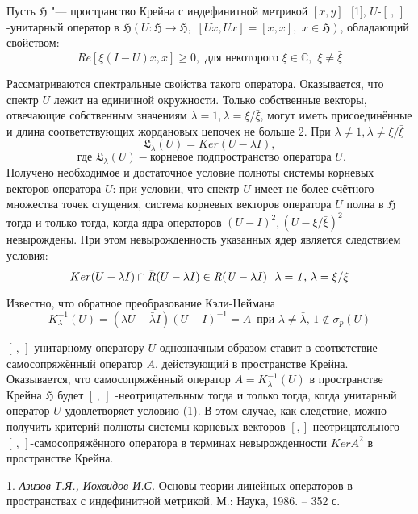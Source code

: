 

\vzmscaption
\sloppy
 Пусть $\mathfrak{H}$ "--- пространство Крейна с индефинитной метрикой $[x, y]$ \,\,[1], $U$-$[ \,, \,]$-унитарный оператор в $\mathfrak{H}( U:\mathfrak{H}\rightarrow\mathfrak{H},\,\,[Ux, Ux] = [x, x],\,\,x\in \mathfrak{H})$, обладающий свойством:
 \begin{equation}
Re[\xi(I - U)x, x]\geq 0,\,\,\text{для некоторого}\,\, \xi\in \mathbb{C},\,\,\xi\neq\bar{\xi}
\end{equation}

				Рассматриваются спектральные свойства такого оператора. Оказывается, что спектр $U$ лежит на единичной окружности. Только собственные векторы, отвечающие собственным значениям $\lambda = 1$,\,$\lambda=\xi/\bar{\xi}$, могут иметь присоединённые и длина соответствующих жордановых цепочек не больше 2. При $\lambda\neq 1, \lambda\neq\xi/\bar{\xi}$
 $$
\mathfrak{L}_{\lambda}(U) = Ker (U-\lambda I),$$$$ \,\, \text{где}\,\,\mathfrak{L}_{\lambda}(U) - \text{корневое подпространство оператора}\,\,U.
$$
 Получено необходимое и достаточное условие полноты системы корневых векторов оператора $U$: при условии, что спектр $U$ имеет не более счётного множества точек сгущения, система корневых векторов оператора $U$ полна в $\mathfrak{H}$ тогда и только тогда, когда ядра операторов $(U - I)^2$,\,$(U - \xi/\bar{\xi})^2$ невырождены. При этом невырожденность указанных ядер является следствием условия:
$$
Ker(U - \lambda I)\cap\bar{\it{R}}(U - \lambda I)\in \it{R}(U - \lambda I)\,\,\,\,\lambda = 1,\,\lambda = \xi/\bar{\xi}
$$

		Известно, что обратное преобразование Кэли-Неймана
$$
K^{-1}_{\lambda}(U) = (\lambda U - \bar{\lambda}I)(U - I)^{-1} = A\,\,\,\text{при}\,\, \lambda\neq \bar{\lambda}, \, 1\notin\sigma_p(U)
$$

$[ \,, \,]$-унитарному оператору $U$ однозначным образом ставит в соответствие самосопряжённый оператор $A$, действующий в пространстве Крейна. Оказывается, что самосопряжённый оператор $A = K^{-1}_{\lambda}(U)$ в пространстве Крейна $\mathfrak{H}$ будет $[\, , \,]$ -неотрицательным тогда и только тогда, когда унитарный оператор $U$ удовлетворяет условию (1). В этом случае, как следствие, можно получить критерий полноты системы корневых векторов $[ , ]$-неотрицательного $[\, ,\, ]$-самосопряжённого оператора в терминах невырожденности $Ker A^2$ в
пространстве Крейна.


\litlist

1. {\it Азизов Т.Я., Иохвидов И.С.}
 Основы теории линейных операторов в пространствах с индефинитной метрикой. М.: Наука, 1986. – 352 с.
